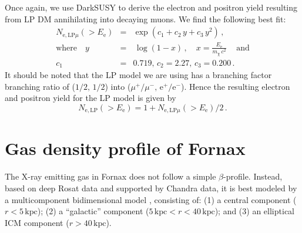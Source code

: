 \documentclass[10pt,aps,pra,reprint,amsmath,amsfonts,amssymb,showpacs,nofootinbib,floatfix]{revtex4-1}
\newcommand{\rmn}{\mathrm}
\newcommand{\ee}{E_\rmn{e}}
\newcommand{\kpc}{\rmn{kpc}}
\newcommand{\e}{\rmn{e}}
\begin{document}
Once again, we use {\sc DarkSUSY} to derive the electron and positron
yield resulting from LP DM annihilating into decaying muons. We find
the following best fit:
\begin{eqnarray}
N_{\e,\rmn{LP}\mu}(>\ee) &=& \exp\left(c_1+c_2\,y+c_3\,y^2\right)
\,,\nonumber\\
\rmn{where}\quad y&=&\,\log\left(1-x\right)\,,\quad 
x=\frac{\ee}{m_\chi\,c^2}\,\quad\rmn{and}\nonumber\\
c_1&=&0.719,\,c_2=2.27,\,c_3=0.200\,.
\label{eq:lp_elec}
\end{eqnarray}
It should be noted that the LP model we are using has a branching
factor branching ratio of ($1/2,\,1/2$) into
($\mu^+/\mu^-,\,\e^+/\e^-$). Hence the resulting electron and positron
yield for the LP model is given by 
\begin{equation}
N_{\e,\rmn{LP}}(>\ee) =
1+N_{\e,\rmn{LP}\mu}(>\ee)/2\,.
\end{equation}

\section{Gas density profile of Fornax}
The X-ray emitting gas in Fornax does not follow a simple
$\beta$-profile. Instead, based on deep Rosat data and supported by
Chandra data, it is best modeled by a multicomponent bidimensional
model \cite{2002ApJ...565..883P}, consisting of: (1) a central
component ($r<5\,\kpc$); (2) a ``galactic'' component
($5\,\kpc<r<40\,\kpc$); and (3) an elliptical ICM component
($r>40\,\kpc$). 
\end{document}

